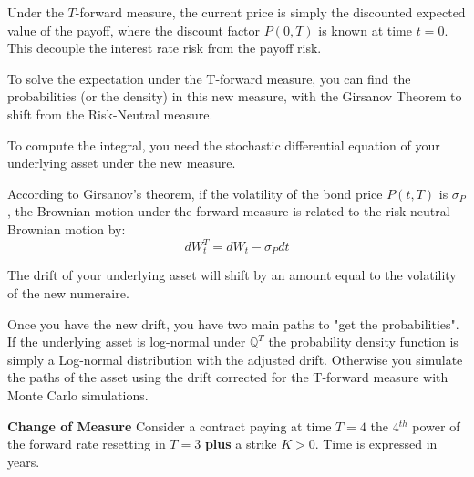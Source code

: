 \documentclass[12pt,a4paper]{exam}
\begin{document}
\begin{questions}
\begin{solution}
	Under the $T$-forward measure, the current price is simply the discounted expected value of the payoff, where the discount factor $P(0, T)$ is known at time $t=0$. This decouple the interest rate risk from the payoff risk.


	To solve the expectation under the T-forward measure, you can find the probabilities (or the density) in this new measure, with the Girsanov Theorem to shift from the Risk-Neutral measure.

	To compute the integral, you need the stochastic differential equation of your underlying asset under the new measure.

	According to Girsanov's theorem, if the volatility of the bond price $P(t,T)$ is $\sigma_P$, the Brownian motion under the forward measure is related to the risk-neutral Brownian motion by:
	\begin{equation*}
		dW_t^T=dW_t-\sigma_P dt
	\end{equation*}

	The drift of your underlying asset will shift by an amount equal to the volatility of the new numeraire.

	Once you have the new drift, you have two main paths to "get the probabilities". If the underlying asset is log-normal under $\mathbb{Q}^T$ the probability density function is simply a Log-normal distribution with the adjusted drift.
	Otherwise you simulate the paths of the asset using the drift corrected for the T-forward measure with Monte Carlo simulations.

\end{solution}



\question \textbf{Change of Measure}
Consider a contract paying at time $T=4$ the 4$^{th}$ power of the forward rate resetting in $T=3$ \textbf{plus} a strike $K > 0$. Time is expressed in years.
\end{questions}
\end{document}
